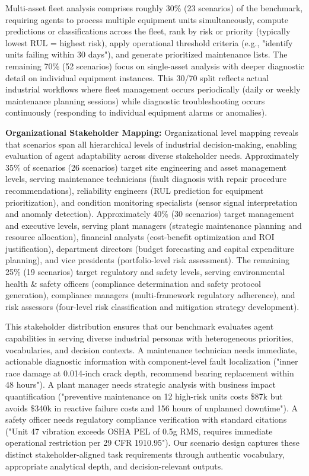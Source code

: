 \documentclass[sigconf,review]{acmart}
\begin{document}
Multi-asset fleet analysis comprises roughly 30\% (23 scenarios) of the benchmark, requiring agents to process multiple equipment units simultaneously, compute predictions or classifications across the fleet, rank by risk or priority (typically lowest RUL = highest risk), apply operational threshold criteria (e.g., "identify units failing within 30 days"), and generate prioritized maintenance lists. The remaining 70\% (52 scenarios) focus on single-asset analysis with deeper diagnostic detail on individual equipment instances. This 30/70 split reflects actual industrial workflows where fleet management occurs periodically (daily or weekly maintenance planning sessions) while diagnostic troubleshooting occurs continuously (responding to individual equipment alarms or anomalies).

\textbf{Organizational Stakeholder Mapping:} Organizational level mapping reveals that scenarios span all hierarchical levels of industrial decision-making, enabling evaluation of agent adaptability across diverse stakeholder needs. Approximately 35\% of scenarios (26 scenarios) target site engineering and asset management levels, serving maintenance technicians (fault diagnosis with repair procedure recommendations), reliability engineers (RUL prediction for equipment prioritization), and condition monitoring specialists (sensor signal interpretation and anomaly detection). Approximately 40\% (30 scenarios) target management and executive levels, serving plant managers (strategic maintenance planning and resource allocation), financial analysts (cost-benefit optimization and ROI justification), department directors (budget forecasting and capital expenditure planning), and vice presidents (portfolio-level risk assessment). The remaining 25\% (19 scenarios) target regulatory and safety levels, serving environmental health \& safety officers (compliance determination and safety protocol generation), compliance managers (multi-framework regulatory adherence), and risk assessors (four-level risk classification and mitigation strategy development).

This stakeholder distribution ensures that our benchmark evaluates agent capabilities in serving diverse industrial personas with heterogeneous priorities, vocabularies, and decision contexts. A maintenance technician needs immediate, actionable diagnostic information with component-level fault localization ("inner race damage at 0.014-inch crack depth, recommend bearing replacement within 48 hours"). A plant manager needs strategic analysis with business impact quantification ("preventive maintenance on 12 high-risk units costs \$87k but avoids \$340k in reactive failure costs and 156 hours of unplanned downtime"). A safety officer needs regulatory compliance verification with standard citations ("Unit 47 vibration exceeds OSHA PEL of 0.5g RMS, requires immediate operational restriction per 29 CFR 1910.95"). Our scenario design captures these distinct stakeholder-aligned task requirements through authentic vocabulary, appropriate analytical depth, and decision-relevant outputs.
\end{document}
